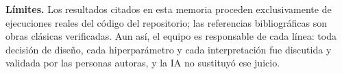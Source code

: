 \textbf{Límites.} Los resultados citados en esta memoria proceden exclusivamente de ejecuciones reales del código del repositorio; las referencias bibliográficas son obras clásicas verificadas. Aun así, el equipo es responsable de cada línea: toda decisión de diseño, cada hiperparámetro y cada interpretación fue discutida y validada por las personas autoras, y la IA no sustituyó ese juicio.

